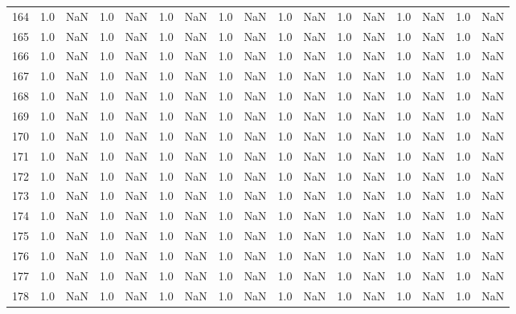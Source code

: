\begin{tabular}{lrrrrrrrrrrrrrrrr}
    164 &  1.0 & NaN &   1.0 &   NaN &   1.0 &   NaN &   1.0 &   NaN &   1.0 &   NaN &   1.0 &   NaN &   1.0 &   NaN &   1.0 &   NaN \\
    165 &  1.0 & NaN &   1.0 &   NaN &   1.0 &   NaN &   1.0 &   NaN &   1.0 &   NaN &   1.0 &   NaN &   1.0 &   NaN &   1.0 &   NaN \\
    166 &  1.0 & NaN &   1.0 &   NaN &   1.0 &   NaN &   1.0 &   NaN &   1.0 &   NaN &   1.0 &   NaN &   1.0 &   NaN &   1.0 &   NaN \\
    167 &  1.0 & NaN &   1.0 &   NaN &   1.0 &   NaN &   1.0 &   NaN &   1.0 &   NaN &   1.0 &   NaN &   1.0 &   NaN &   1.0 &   NaN \\
    168 &  1.0 & NaN &   1.0 &   NaN &   1.0 &   NaN &   1.0 &   NaN &   1.0 &   NaN &   1.0 &   NaN &   1.0 &   NaN &   1.0 &   NaN \\
    169 &  1.0 & NaN &   1.0 &   NaN &   1.0 &   NaN &   1.0 &   NaN &   1.0 &   NaN &   1.0 &   NaN &   1.0 &   NaN &   1.0 &   NaN \\
    170 &  1.0 & NaN &   1.0 &   NaN &   1.0 &   NaN &   1.0 &   NaN &   1.0 &   NaN &   1.0 &   NaN &   1.0 &   NaN &   1.0 &   NaN \\
    171 &  1.0 & NaN &   1.0 &   NaN &   1.0 &   NaN &   1.0 &   NaN &   1.0 &   NaN &   1.0 &   NaN &   1.0 &   NaN &   1.0 &   NaN \\
    172 &  1.0 & NaN &   1.0 &   NaN &   1.0 &   NaN &   1.0 &   NaN &   1.0 &   NaN &   1.0 &   NaN &   1.0 &   NaN &   1.0 &   NaN \\
    173 &  1.0 & NaN &   1.0 &   NaN &   1.0 &   NaN &   1.0 &   NaN &   1.0 &   NaN &   1.0 &   NaN &   1.0 &   NaN &   1.0 &   NaN \\
    174 &  1.0 & NaN &   1.0 &   NaN &   1.0 &   NaN &   1.0 &   NaN &   1.0 &   NaN &   1.0 &   NaN &   1.0 &   NaN &   1.0 &   NaN \\
    175 &  1.0 & NaN &   1.0 &   NaN &   1.0 &   NaN &   1.0 &   NaN &   1.0 &   NaN &   1.0 &   NaN &   1.0 &   NaN &   1.0 &   NaN \\
    176 &  1.0 & NaN &   1.0 &   NaN &   1.0 &   NaN &   1.0 &   NaN &   1.0 &   NaN &   1.0 &   NaN &   1.0 &   NaN &   1.0 &   NaN \\
    177 &  1.0 & NaN &   1.0 &   NaN &   1.0 &   NaN &   1.0 &   NaN &   1.0 &   NaN &   1.0 &   NaN &   1.0 &   NaN &   1.0 &   NaN \\
    178 &  1.0 & NaN &   1.0 &   NaN &   1.0 &   NaN &   1.0 &   NaN &   1.0 &   NaN &   1.0 &   NaN &   1.0 &   NaN &   1.0 &   NaN \\

\end{tabular}
